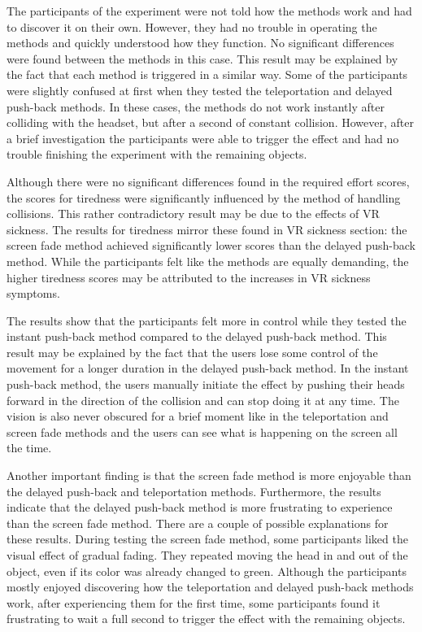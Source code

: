 The participants of the experiment were not told how the methods work and had to discover it on their own. However, they had no trouble in operating the methods and quickly understood how they function. No significant differences were found between the methods in this case. This result may be explained by the fact that each method is triggered in a similar way. Some of the participants were slightly confused at first when they tested the teleportation and delayed push-back methods. In these cases, the methods do not work instantly after colliding with the headset, but after a second of constant collision. However, after a brief investigation the participants were able to trigger the effect and had no trouble finishing the experiment with the remaining objects.

Although there were no significant differences found in the required effort scores, the scores for tiredness were significantly influenced by the method of handling collisions. This rather contradictory result may be due to the effects of VR sickness. The results for tiredness mirror these found in VR sickness section: the screen fade method achieved significantly lower scores than the delayed push-back method. While the participants felt like the methods are equally demanding, the higher tiredness scores may be attributed to the increases in VR sickness symptoms.

The results show that the participants felt more in control while they tested the instant push-back method compared to the delayed push-back method. This result may be explained by the fact that the users lose some control of the movement for a longer duration in the delayed push-back method. In the instant push-back method, the users manually initiate the effect by pushing their heads forward in the direction of the collision and can stop doing it at any time. The vision is also never obscured for a brief moment like in the teleportation and screen fade methods and the users can see what is happening on the screen all the time.

Another important finding is that the screen fade method is more enjoyable than the delayed push-back and teleportation methods. Furthermore, the results indicate that the delayed push-back method is more frustrating to experience than the screen fade method. There are a couple of possible explanations for these results. During testing the screen fade method, some participants liked the visual effect of gradual fading. They repeated moving the head in and out of the object, even if its color was already changed to green. Although the participants mostly enjoyed discovering how the teleportation and delayed push-back methods work, after experiencing them for the first time, some participants found it frustrating to wait a full second to trigger the effect with the remaining objects.